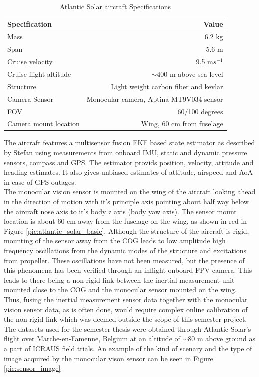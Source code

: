 \begin{table}%
\vspace{-10pt}
\centering
\caption{Atlantic Solar aircraft Specifications}
\begin{tabu} to 0.4\textwidth {l|r}
\textbf{Specification} & \textbf{Value} \\ \hline
Mass & 6.2 kg \\
Span & 5.6 m \\
Cruise velocity & 9.5 m$s^{-1}$\\
Cruise flight altitude & $\sim$400 m above sea level\\
Structure & Light weight carbon fiber and kevlar\\ \hline
Camera Sensor & Monocular camera, Aptina MT9V034 sensor\\
FOV & 60/100 degrees \\
Camera mount location & Wing, 60 cm from fuselage \\
\bottomrule
\end{tabu}
\label{tab:atl_sol_specs}
\end{table}

The aircraft features a multisensor fusion EKF based state estimator as described by Stefan \cite{6981466} using measurements from onboard IMU, static and dynamic pressure sensors, compass and GPS. The estimator provids position, velocity, attitude and heading estimates. It also gives unbiased estimates of attitude, airspeed and AoA in case of GPS outages.\\
The monocular vision sensor is mounted on the wing of the aircraft looking ahead in the direction of motion with it's principle axis pointing about half way below the aircraft nose axis to it's body z axis (body yaw axis). The sensor mount location is about 60 cm away from the fuselage on the wing, as shown in red in Figure \ref{pic:atlantic_solar_basic}. Although the structure of the aircraft is rigid, mounting of the sensor away from the COG leads to low amplitude high frequency oscillations from the dynamic modes of the structure and excitations from propeller. These oscillations have not been measured, but the presence of this phenomena has been verified through an inflight onboard FPV camera. This leads to there being a non-rigid link between the inertial measurement unit mounted close to the COG and the monocular sensor mounted on the wing. Thus, fusing the inertial measurement sensor data together with the monocular vision sensor data, as is often done, would require complex online calibration of the non-rigid link which was deemed outside the scope of this semester project.\\
The datasets used for the semester thesis were obtained through Atlantic Solar's flight over Marche-en-Famenne, Belgium at an altitude of $\sim$80 m above ground as a part of ICRAUS field trials. An example of the kind of scenary and the type of image acquired by the monocular vison sensor can be seen in Figure \ref{pic:sensor_image}\\

